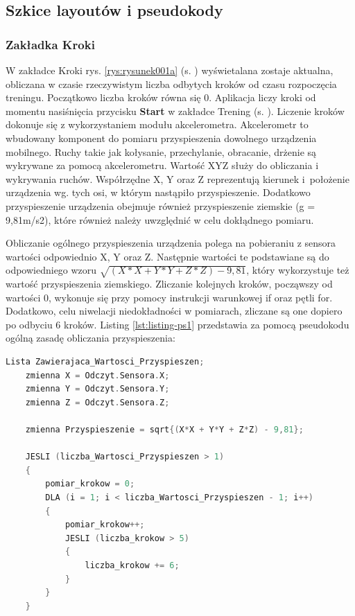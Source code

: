 \subsection{Szkice layoutów i pseudokody}		%

\subsubsection{Zakładka Kroki} %

\hspace{0.60cm}W zakładce Kroki rys. \ref{rys:rysunek001a} (s. \pageref{rys:rysunek001a}) wyświetalana zostaje aktualna, obliczana w czasie rzeczywistym liczba odbytych kroków od czasu rozpoczęcia treningu. Początkowo liczba kroków równa się 0. Aplikacja liczy kroki od momentu nasiśnięcia przycisku \textbf{Start} w zakładce Trening (s. \pageref{rys:rysunek001b}). Liczenie kroków dokonuje się z wykorzystaniem modułu akcelerometra. Akcelerometr to wbudowany komponent do pomiaru przyspieszenia dowolnego urządzenia mobilnego. Ruchy takie jak kołysanie, przechylanie, obracanie, drżenie są wykrywane za pomocą akcelerometru. Wartość XYZ służy do obliczania i wykrywania ruchów. Współrzędne X, Y oraz Z reprezentują kierunek i~położenie urządzenia wg. tych osi, w którym nastąpiło przyspieszenie. Dodatkowo przyspieszenie urządzenia obejmuje również przyspieszenie ziemskie (g = 9,81m/s2), które również należy uwzględnić w celu dokłądnego pomiaru.

Obliczanie ogólnego przyspieszenia urządzenia polega na pobieraniu z sensora wartości odpowiednio X, Y oraz Z. Następnie wartości te podstawiane są do odpowiedniego wzoru $\sqrt{(X*X + Y*Y + Z*Z) - 9,81}$, który wykorzystuje też wartość przyspieszenia ziemskiego. Zliczanie kolejnych kroków, począwszy od wartości 0, wykonuje się przy pomocy instrukcji warunkowej if oraz pętli for. Dodatkowo, celu niwelacji niedokładności w pomiarach, zliczane są one dopiero po odbyciu 6 kroków. Listing \ref{lst:listing-ps1} przedstawia za pomocą pseudokodu ogólną zasadę obliczania przyspieszenia:

\begin{lstlisting}[caption=Pseudokod działania krokomierza, label={lst:listing-ps1}, language=C++]
	Lista Zawierajaca_Wartosci_Przyspieszen;
	zmienna X = Odczyt.Sensora.X;
	zmienna Y = Odczyt.Sensora.Y;
	zmienna Z = Odczyt.Sensora.Z;
	
	zmienna Przyspieszenie = sqrt{(X*X + Y*Y + Z*Z) - 9,81};
	
	JESLI (liczba_Wartosci_Przyspieszen > 1)
	{
		pomiar_krokow = 0;
		DLA (i = 1; i < liczba_Wartosci_Przyspieszen - 1; i++)
		{
			pomiar_krokow++;
			JESLI (liczba_krokow > 5)
			{
				liczba_krokow += 6;
			}
		}
	}
\end{lstlisting}

